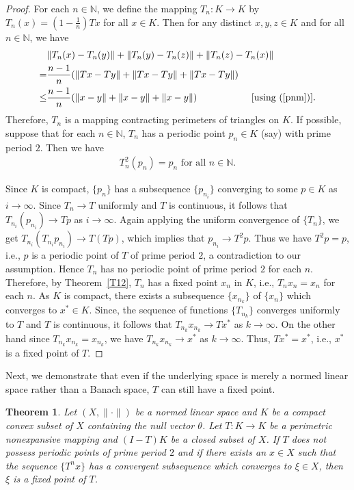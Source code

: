 \documentclass[11pt,reqno]{amsart}
\newtheorem{theorem}{Theorem}[section]
\theoremstyle{definition}
\newtheorem{Open Prob}[theorem]{Open Problem}
\theoremstyle{remark}
\numberwithin{equation}{section}
\begin{document}
\begin{proof}
For each $n \in \mathbb{N}$, we define the mapping $T_n:K \to K$ by $T_n(x)=(1 - \frac{1}{n}) Tx$ for all $x \in K$. Then  for any distinct $x,y,z \in K$ and for all $n \in \mathbb{N}$, we have 
\begin{align*}
&\lVert T_n(x) -T_n(y)\rVert + \lVert T_n(y) -T_n(z)\rVert +\lVert T_n(z) -T_n(x)\rVert\\
=& \frac{n-1}{n} (\lVert Tx -Ty\rVert + \lVert Tx - Ty\rVert + \lVert Tx -Ty \rVert)\\
\le &\frac{n-1}{n} (\lVert x -y\rVert + \lVert x - y\rVert + \lVert x - y \rVert)  \hspace{2cm} [\text{using } (\ref{pnm})].
\end{align*}
Therefore, $T_n$ is a mapping contracting perimeters of triangles on $K$. 
If possible, suppose that for each $n \in \mathbb{N}$, $T_n$ has a periodic point $p_n \in K$ (say) with prime period $2$. Then we have
\begin{align*}
    T_n^2 (p_n)= p_n \text{ for all } n \in \mathbb{N}.
\end{align*}

Since $K$ is compact, $\{p_n\}$ has a subsequence $\{p_{n_i}\}$ converging to some $p \in K$ as $i \to \infty$. Since $T_n \to T$ uniformly and $T$ is continuous, it follows that $ {T_{n_i}} (p_{n_i}) \to Tp$ as $i \to \infty$. Again applying the uniform convergence of $\{T_{n}\}$, we get $ {T_{n_i}} (T_{n_i}p_{n_i}) \to T (Tp )$, which implies that $ p_{n_i} \to T^2 p$. Thus we have $T^2p = p$, i.e., $p$ is a periodic point of $T$ of prime period $2$,   a contradiction to our assumption.
Hence $T_n$ has no periodic point of prime period $2$ for each $n$. Therefore, by Theorem~\ref{T12}, $T_n$ has a fixed point $x_n$ in $K$, i.e., $T_n x_n=x_n$ for each $n$. As $K$ is compact, there exists a subsequence $\{x_{n_k}\}$ of $\{x_n\}$ which converges to $x^* \in K.$ Since, the sequence of functions $\{T_{n_k}\}$ converges uniformly to $T$ and $T$ is continuous, it follows that $T_{n_k} x_{n_k} \to T x^*$ as $k\to \infty$. On the other hand since $T_{n_k} x_{n_k} =x_{n_k}$, we have $T_{n_k} x_{n_k} \to  x^*$ as $k\to \infty$. Thus, $Tx^*=x^*$, i.e., $x^*$ is a fixed point of $T$.
\end{proof}

Next, we demonstrate that even if the underlying space is merely a normed linear space rather than a Banach space, $T$ can still have a fixed point.

\begin{theorem}\label{T34}
Let $(X,\|\cdot\|)$ be a normed linear space and $K$ be a compact convex subset of $X$ containing the null vector $\theta$. Let $T: K \to K$ be a perimetric nonexpansive mapping and $(I-T)K$ be a closed subset of $X$. If $T$ does not possess periodic points of prime period $2$ and if there exists an $x \in X$ such that the sequence $\{T^n x\}$ has a convergent subsequence which converges to $\xi \in X$, then $\xi$ is a fixed point of $T$. 
\end{theorem}
\end{document}
